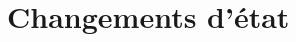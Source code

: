 \documentclass[../main/main.tex]{subfiles}
\begin{document}
\setcounter{chapter}{3}

\chapter{Changements d'état}
\end{document}

